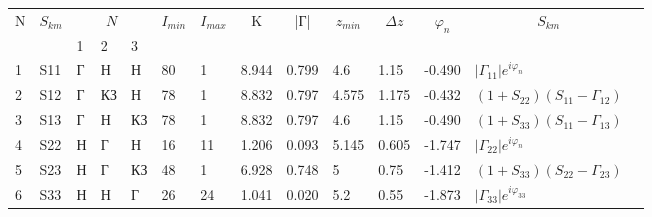 
	\begin{tabular}{|l|l|l|l|l|l|l|l|l|l|l|l|l|l}
	\cline{1-13}
	\multicolumn{1}{|c|}{\multirow{2}{*}{N}} & 
	\multicolumn{1}{c|}{\multirow{2}{*}{$S_{km}$}} & 
	\multicolumn{3}{c|}{$N_{}$} &
	\multicolumn{1}{c|}{\multirow{2}{*}{$I_{min}$}} & 
	\multicolumn{1}{c|}{\multirow{2}{*}{$I_{max}$}} & 
	\multicolumn{1}{c|}{\multirow{2}{*}{K}} & 
	\multicolumn{1}{c|}{\multirow{2}{*}{|Г|}} & 
	\multicolumn{1}{c|}{\multirow{2}{*}{$z_{min}$}} & 
	\multicolumn{1}{c|}{\multirow{2}{*}{$\Delta z$}} & 
	\multicolumn{1}{c|}{\multirow{2}{*}{$\varphi_n$}} & 
	\multicolumn{1}{c|}{\multirow{2}{*}{$S_{km}$}} &  \\ \cline{3-5}
	\multicolumn{1}{|c|}{} & 
	\multicolumn{1}{c|}{}  & 1  & 2   & 3  & 
	\multicolumn{1}{c|}{}  & 
	\multicolumn{1}{c|}{}  & 
	\multicolumn{1}{c|}{}  & 
	\multicolumn{1}{c|}{}  & 
	\multicolumn{1}{c|}{}  & 
	\multicolumn{1}{c|}{}  & 
	\multicolumn{1}{c|}{}  & 
	\multicolumn{1}{c|}{}  &  \\ \cline{1-13}
	1& S11& Г  & Н   & Н  & 80  & 1   & 8.944   & 0.799 & 4.6  & 1.15 & -0.490& $|\Gamma_{11}|e^{i\varphi_n}$     &  \\ \cline{1-13}
	2& S12& Г  & КЗ  & Н  & 78  & 1   & 8.832   & 0.797 & 4.575& 1.175& -0.432& $(1+S_{22})(S_{11}-\Gamma_{12})$  &  \\ \cline{1-13}
	3& S13& Г  & Н   & КЗ & 78  & 1   & 8.832   & 0.797 & 4.6  & 1.15 &-0.490& $(1+S_{33})(S_{11}-\Gamma_{13})$  &  \\ \cline{1-13}
	4& S22& Н  & Г   & Н  & 16  & 11  & 1.206   & 0.093 & 5.145& 0.605& -1.747& $|\Gamma_{22}|e^{i\varphi_n}$     &  \\ \cline{1-13}
	5& S23& Н  & Г   & КЗ & 48  & 1   & 6.928   & 0.748 & 5    & 0.75 & -1.412& $(1+S_{33})(S_{22}-\Gamma_{23})$  &  \\ \cline{1-13}
	6& S33& Н  & Н   & Г  & 26  & 24  & 1.041   & 0.020 & 5.2  & 0.55 & -1.873& $|\Gamma_{33}|e^{i\varphi_{33}}$  &  \\ \cline{1-13}
	\end{tabular}
